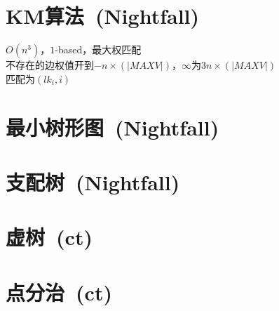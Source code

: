 \section{KM算法\ \small(Nightfall)}
    $ O(n^3) $，$ 1 $-based，最大权匹配
    \\不存在的边权值开到$ -n \times (\left| MAXV \right|) $，$ \infty $为$ 3 n \times (\left| MAXV \right|) $
    \\匹配为$ (lk_i, i) $
\section{最小树形图\ \small(Nightfall)}
\section{支配树\ \small(Nightfall)}
\section{虚树\ \small(ct)}
\section{点分治\ \small(ct)}
